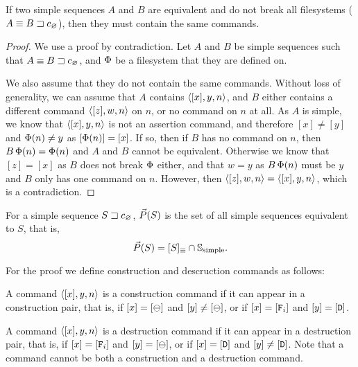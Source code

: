 
\begin{mylem}\label{equiv_simple_same_commands}
If two simple sequences $A$ and $B$ are equivalent
and do not break all filesystems ($A\equiv {B}\sqsupset c_\varnothing$),
then they must contain the same commands.
\end{mylem}
\begin{proof}
We use a proof by contradiction. Let $A$ and $B$ be simple sequences
such that $A\equiv {B}\sqsupset c_\varnothing$,
and $\Phi$ be a filesystem that they are defined on.

We also assume that they do not contain the same commands.
Without loss of generality, we can assume
that $A$
contains $\langle{[x],y,n}\rangle$, and $B$ either contains a different command
$\langle{[z],w,n}\rangle$ on $n$, or no command on $n$ at all.
As $A$ is simple, we know that $\langle{[x],y,n}\rangle$ is not an assertion command,
and therefore $[x]\neq [y]$ and $\Phi(n)\neq y$ as $[\Phi(n)]=[x]$.
If so, then if $B$ has no command on $n$, then $B\,\Phi(n)=\Phi(n)$ and
$A$ and $B$ cannot be equivalent.
Otherwise we know that $[z]=[x]$ as $B$ does not break $\Phi$ either,
and that $w=y$ as $B\,\Phi(n)$ must
be $y$ and $B$ only has one command on $n$.
However, then $\langle{[z],w,n}\rangle=\langle{[x],y,n}\rangle$, which is a contradiction.
\end{proof}



\begin{mylem}\label{simple_reorder_equiv}
For a simple sequence ${S}\sqsupset c_\varnothing$,
$\vec{P}({S})$ is the set of all simple sequences equivalent to $S$, that is,
\[ \vec{P}({S}) = [S]_\equiv \cap \mathbb{S}_{\mathrm{simple}}. \]
\end{mylem}

For the proof we define construction and descruction commands as follows:
\begin{mydef}
A command $\langle{[x],y,n}\rangle$ is a construction command if it can appear in a construction pair,
that is, if $[x]=[\ominus]$ and $[y]\neq[\ominus]$,
or if $[x]=[\mathtt{F}_i]$ and $[y]=[\mathtt{D}]$.
\end{mydef}
\begin{mydef}
A command $\langle{[x],y,n}\rangle$ is a destruction command if it can appear in a destruction pair,
that is, 
if $[x]=[\mathtt{F}_i]$ and $[y]=[\ominus]$,
or if $[x]=[\mathtt{D}]$ and $[y]\neq[\mathtt{D}]$.
Note that a command cannot be both a construction and a destruction command.
\end{mydef}


